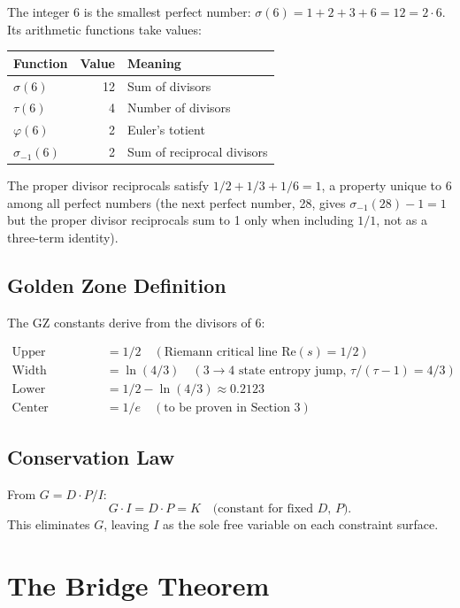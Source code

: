 \documentclass[11pt,a4paper]{article}
\begin{document}
The integer 6 is the smallest perfect number: $\sigma(6) = 1 + 2 + 3 + 6 = 12 = 2 \cdot 6$. Its arithmetic functions take values:

\begin{center}
\begin{tabular}{lrl}
\toprule
Function & Value & Meaning \\
\midrule
$\sigma(6)$ & 12 & Sum of divisors \\
$\tau(6)$ & 4 & Number of divisors \\
$\varphi(6)$ & 2 & Euler's totient \\
$\sigma_{-1}(6)$ & 2 & Sum of reciprocal divisors \\
\bottomrule
\end{tabular}
\end{center}

The proper divisor reciprocals satisfy $1/2 + 1/3 + 1/6 = 1$, a property unique to 6 among all perfect numbers (the next perfect number, 28, gives $\sigma_{-1}(28) - 1 = 1$ but the proper divisor reciprocals sum to 1 only when including $1/1$, not as a three-term identity).

\subsection{Golden Zone Definition}

The GZ constants derive from the divisors of 6:

\begin{align*}
\text{Upper boundary} &= 1/2 \quad (\text{Riemann critical line } \mathrm{Re}(s) = 1/2) \\
\text{Width} &= \ln(4/3) \quad (3 \to 4 \text{ state entropy jump, } \tau/(\tau-1) = 4/3) \\
\text{Lower boundary} &= 1/2 - \ln(4/3) \approx 0.2123 \\
\text{Center} &= 1/e \quad (\text{to be proven in Section~3})
\end{align*}

\subsection{Conservation Law}

From $G = D \cdot P / I$:
\[
G \cdot I = D \cdot P = K \quad \text{(constant for fixed } D,\, P\text{).}
\]
This eliminates $G$, leaving $I$ as the sole free variable on each constraint surface.

\section{The Bridge Theorem}
\end{document}
